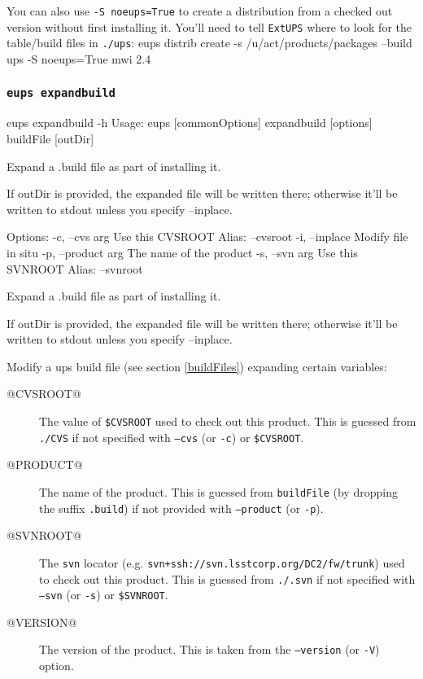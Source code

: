 \documentclass{article}
\newcommand{\code}[1]{\texttt{#1}}
\newcommand{\eups}{\code{ExtUPS}\xspace}
\let\overbatim=\verbatim
\let\oendverbatim=\endverbatim
\renewenvironment{verbatim}
{\center\minipage{16cm}\overbatim}
{\oendverbatim\endminipage\endcenter}
\begin{document}
You can also use \code{-S noeups=True} to create a distribution from a checked out version without
first installing it.  You'll need to tell \eups where to look for the table/build files
in \code{./ups}:
\begin{verbatim}
eups distrib create -s /u/act/products/packages --build ups -S noeups=True mwi 2.4
\end{verbatim}


\subsubsection{\code{eups expandbuild}}
\begin{verbatim}
eups expandbuild -h
Usage:
    eups [commonOptions] expandbuild [options] buildFile [outDir]

    Expand a .build file as part of installing it.

    If outDir is provided, the expanded file will be written there;
    otherwise it'll be written to stdout unless you specify --inplace.

Options:
   -c, --cvs        arg    Use this CVSROOT
                           Alias: --cvsroot
   -i, --inplace           Modify file in situ
   -p, --product    arg    The name of the product
   -s, --svn        arg    Use this SVNROOT
                           Alias: --svnroot

Expand a .build file as part of installing it.

If outDir is provided, the expanded file will be written there;
otherwise it'll be written to stdout unless you specify --inplace.
\end{verbatim}

Modify a ups build file (see section \ref{buildFiles}) expanding certain variables:
\begin{description}
  \item[\small @CVSROOT@] The value of \code{\$CVSROOT} used to check out this product.
    This is guessed from \code{./CVS} if not specified with \code{--cvs} (or \code{-c})
    or \code{\$CVSROOT}.
  \item[\small @PRODUCT@] The name of the product. This is guessed from \code{buildFile}
    (by dropping the suffix \code{.build}) if not provided with \code{--product} (or \code{-p}).
  \item[\small @SVNROOT@] The \code{svn} locator (e.g. \code{svn+ssh://svn.lsstcorp.org/DC2/fw/trunk})
    used to check out this product.
    This is guessed from \code{./.svn} if not specified with \code{--svn} (or \code{-s})
    or \code{\$SVNROOT}.
  \item[\small @VERSION@] The version of the product.  This is taken from the \code{--version} (or
    \code{-V}) option.
\end{description}
\end{document}
